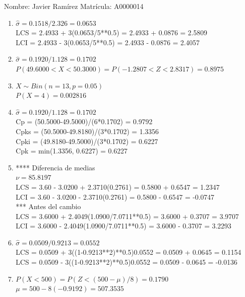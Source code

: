 \documentclass[8pt]{report}
\begin{document}
 \newpage

Nombre: \underline{\hspace*{.2in}}
Javier Ramírez
\underline{\hspace*{.2in}} \quad Matr\'icula:\underline{\hspace*{.2in}}
A0000014
\underline{\hspace*{.2in}} \\

\begin{enumerate}
\item $\hat\sigma = 0.1518/2.326 = 0.0653$\\
LCS = 2.4933 + 3(0.0653/5**0.5) = 2.4933 + 0.0876 = 2.5809\\
LCI = 2.4933 - 3(0.0653/5**0.5) = 2.4933 - 0.0876 = 2.4057
\item $\hat\sigma = 0.1920/1.128 = 0.1702$\\
$P(49.6000 < X < 50.3000) = P(-1.2807 < Z < 2.8317) = 0.8975$\\
\item $X \sim Bin(n=13, p=0.05)$\\
$P(X = 4) = 0.002816$
\item $\hat\sigma = 0.1920/1.128 = 0.1702$\\
Cp = (50.5000-49.5000)/(6*0.1702) = 0.9792\\
Cpks = (50.5000-49.8180)/(3*0.1702) = 1.3356\\
Cpki = (49.8180-49.5000)/(3*0.1702) = 0.6227\\
Cpk = min(1.3356, 0.6227) = 0.6227
\item **** Diferencia de medias\\
$\nu = 85.8197$\\
LCS = 3.60 - 3.0200 + 2.3710(0.2761) = 0.5800 + 0.6547 = 1.2347\\
LCI = 3.60 - 3.0200 - 2.3710(0.2761) = 0.5800 - 0.6547 = -0.0747\\
*** Antes del cambio\\
LCS = 3.6000 + 2.4049(1.0900/7.0711**0.5) = 3.6000 + 0.3707 = 3.9707\\
LCI = 3.6000 - 2.4049(1.0900/7.0711**0.5) = 3.6000 - 0.3707 = 3.2293\\
\item $\hat\sigma = 0.0509/0.9213 = 0.0552$\\
LCS = 0.0509 + 3((1-0.9213**2)**0.5)0.0552 = 0.0509 + 0.0645 = 0.1154\\
LCS = 0.0509 - 3((1-0.9213**2)**0.5)0.0552 = 0.0509 - 0.0645 = -0.0136
\item $P(X < 500) = P(Z < (500-\mu)/8) = 0.1790$\\
$\mu = 500 - 8(-0.9192) = 507.3535$\\
\end{enumerate}
\end{document}
